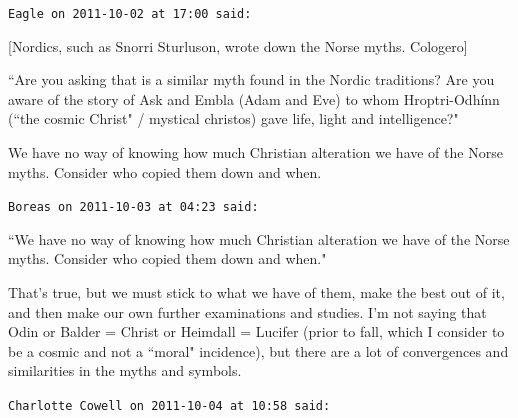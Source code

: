 \begin{footnotesize}
\begin{sffamily}
\hfill

\texttt{Eagle on 2011-10-02 at 17:00 said: }

[Nordics, such as Snorri Sturluson, wrote down the Norse myths. Cologero]

``Are you asking that is a similar myth found in the Nordic traditions? Are you aware of the story of Ask and Embla (Adam and Eve) to whom Hroptri-Odhínn (``the cosmic Christ" / mystical christos) gave life, light and intelligence?"

We have no way of knowing how much Christian alteration we have of the Norse myths. Consider who copied them down and when.


\hfill

\texttt{Boreas on 2011-10-03 at 04:23 said: }

``We have no way of knowing how much Christian alteration we have of the Norse myths. Consider who copied them down and when."

That's true, but we must stick to what we have of them, make the best out of it, and then make our own further examinations and studies. I'm not saying that Odin or Balder = Christ or Heimdall = Lucifer (prior to fall, which I consider to be a cosmic and not a ``moral" incidence), but there are a lot of convergences and similarities in the myths and symbols.


\hfill

\texttt{Charlotte Cowell on 2011-10-04 at 10:58 said: }


\end{sffamily}
\end{footnotesize}

